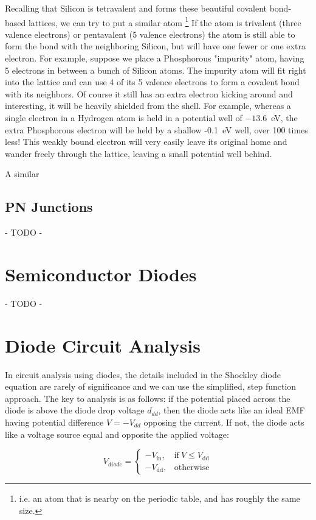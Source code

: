 \documentclass{tufte-book}
\begin{document}
Recalling that Silicon is tetravalent and forms these beautiful covalent bond-based lattices, we can try to put a similar atom \footnote{i.e. an atom that is nearby on the periodic table, and has roughly the same size.} If the atom is trivalent (three valence electrons) or pentavalent (5 valence electrons) the atom is still able to form the bond with the neighboring Silicon, but will have one fewer or one extra electron. For example, suppose we place a Phosphorous "impurity" atom, having 5 electrons in between a bunch of Silicon atoms. The impurity atom will fit right into the lattice and can use 4 of its 5 valence electrons to form a covalent bond with its neighbors. Of course it still has an extra electron kicking around and interesting, it will be heavily shielded from the shell. For example, whereas a single electron in a Hydrogen atom is held in a potential well of $-13.6$~eV, the extra Phosphorous electron will be held by a shallow -0.1~eV well, over 100 times less! This weakly bound electron will very easily leave its original home and wander freely through the lattice, leaving a small potential well behind. 

A similar 

\subsection{PN Junctions}
- TODO -
\section{Semiconductor Diodes}
- TODO -
\section{Diode Circuit Analysis}
In circuit analysis using diodes, the details included in the Shockley diode equation are rarely of significance and we can use the simplified, step function approach. The key to analysis is as follows: if the potential placed across the diode is above the diode drop voltage $d_{dd}$, then the diode acts like an ideal EMF having potential difference $V = -V_{dd}$ opposing the current. If not, the diode acts like a voltage source equal and opposite the applied voltage:

\begin{equation}
\label{eq:effective_diode_source}
    V_{diode}=
    \begin{cases}
      -V_\text{in}, & \text{if}\ V\le V_\text{dd} \\
      -V_\text{dd}, & \text{otherwise}
    \end{cases}
  \end{equation}
\end{document}
